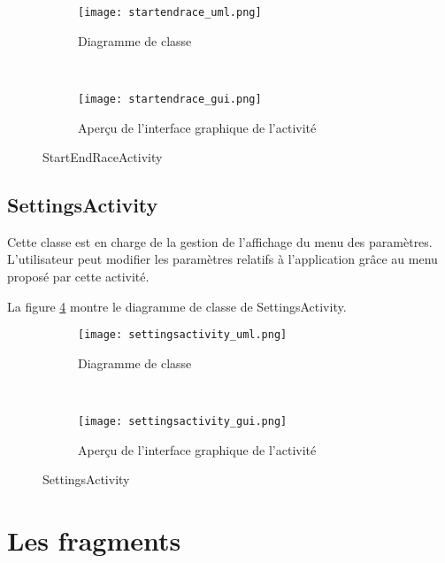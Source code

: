 \begin{figure}[htb!]
    \centering
    \begin{subfigure}[htb]{0.49\textwidth}
		\texttt{[image: startendrace\_uml.png]} 
		\caption{Diagramme de classe}
		\label{fig:startendrace_uml}
    \end{subfigure}
    ~ %
    \begin{subfigure}[htb]{0.49\textwidth}
		\texttt{[image: startendrace\_gui.png]} 
		\caption{Aperçu de l'interface graphique de l'activité}
		\label{fig:startendrace_gui}
    \end{subfigure}
    \caption{StartEndRaceActivity}\label{fig:startendrace_fig}
\end{figure}

\subsection{SettingsActivity}

Cette classe est en charge de la gestion de l'affichage du menu des paramètres. L'utilisateur peut modifier les paramètres relatifs à l'application grâce au menu proposé par cette activité.

La figure \ref{fig:settingsactivity_uml} montre le diagramme de classe de SettingsActivity.

\begin{figure}[htb!]
    \centering
    \begin{subfigure}[htb]{0.49\textwidth}
		\texttt{[image: settingsactivity\_uml.png]} 
		\caption{Diagramme de classe}
		\label{fig:settingsactivity_uml}
    \end{subfigure}
    ~ %
    \begin{subfigure}[htb]{0.49\textwidth}
		\texttt{[image: settingsactivity\_gui.png]} 
		\caption{Aperçu de l'interface graphique de l'activité}
		\label{fig:settingsactivity_gui}
    \end{subfigure}
    \caption{SettingsActivity}\label{fig:settingsactivity_fig}
\end{figure}

\section{Les fragments}

